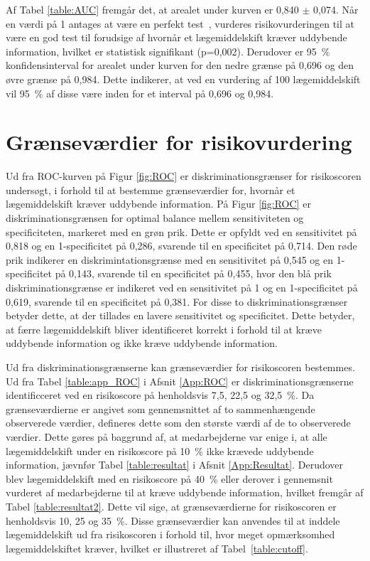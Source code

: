 Af Tabel \ref{table:AUC} fremgår det, at arealet under kurven er 0,840 $\pm$ 0,074. Når en værdi på 1 antages at være en perfekt test~\citep{Greiner2000}, vurderes risikovurderingen til at være en god test til forudsige af hvornår et lægemiddelskift kræver uddybende information, hvilket er statistisk signifikant (p=0,002). Derudover er 95~\% konfidensinterval for arealet under kurven for den nedre grænse på 0,696 og den øvre grænse på 0,984. Dette indikerer, at ved en vurdering af 100 lægemiddelskift vil 95~\% af disse være inden for et interval på 0,696 og 0,984.

\section{Grænseværdier for risikovurdering}
Ud fra ROC-kurven på Figur \ref{fig:ROC}  er diskriminationsgrænser for risikoscoren undersøgt, i forhold til at bestemme grænseværdier for, hvornår et lægemiddelskift kræver uddybende information. På Figur \ref{fig:ROC} er diskriminationsgrænsen for optimal balance mellem sensitiviteten og specificiteten, markeret med en grøn prik. Dette er opfyldt ved en sensitivitet på 0,818 og en 1-specificitet på 0,286, svarende til en specificitet på 0,714. Den røde prik indikerer en diskrimintationsgrænse med en sensitivitet på 0,545 og en 1-specificitet på 0,143, svarende til en specificitet på 0,455, hvor den blå prik diskriminationsgrænse er indikeret ved en sensitivitet på 1 og en 1-specificitet på 0,619, svarende til en specificitet på 0,381. For disse to diskriminationsgrænser betyder dette, at der tillades en lavere sensitivitet og specificitet. Dette betyder, at færre lægemiddelskift bliver identificeret korrekt i forhold til at kræve uddybende information og ikke kræve uddybende information.


Ud fra diskriminationsgrænserne kan grænseværdier for risikoscoren bestemmes. Ud fra Tabel \ref{table:app_ROC} i Afsnit \ref{App:ROC} er diskriminationsgrænserne identificceret ved en risikoscore på  henholdsvis 7,5, 22,5 og 32,5~\%. Da grænseværdierne er angivet som gennemsnittet af to sammenhængende observerede værdier, defineres dette som den største værdi af de to observerede værdier. Dette gøres på baggrund af, at medarbejderne var enige i, at alle lægemiddelskift under en risikoscore på 10~\% ikke krævede uddybende information, jævnfør Tabel \ref{table:resultat} i Afsnit \ref{App:Resultat}. Derudover blev
lægemiddelskift med en risikoscore på 40~\% eller derover i gennemsnit vurderet af medarbejderne til at kræve uddybende information, hvilket fremgår af Tabel \ref{table:resultat2}. Dette vil sige, at grænseværdierne for risikoscoren er henholdsvis 10, 25 og 35~\%. Disse grænseværdier kan anvendes til at inddele lægemiddelskift ud fra risikoscoren i forhold til, hvor meget opmærksomhed lægemiddelskiftet kræver, hvilket er illustreret af Tabel~\ref{table:cutoff}.

